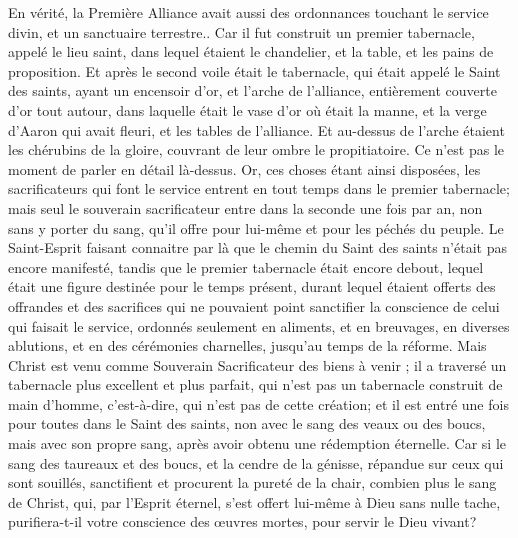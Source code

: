 \begin{multicols}{2}
\VerseOne{}En vérité, la Première Alliance avait aussi des ordonnances touchant le service divin, et un sanctuaire terrestre..
Car il fut construit un premier tabernacle, appelé le lieu saint, dans lequel étaient le chandelier, et la table, et les pains de proposition.
Et après le second voile était le tabernacle, qui était appelé le Saint des saints,
ayant un encensoir d'or, et l'arche de l'alliance, entièrement couverte d'or tout autour, dans laquelle était le vase d'or où était la manne, et la verge d'Aaron qui avait fleuri, et les tables de l'alliance.
Et au-dessus de l'arche étaient les chérubins de la gloire, couvrant de leur ombre le propitiatoire. Ce n'est pas le moment de parler en détail là-dessus.
Or, ces choses étant ainsi disposées, les sacrificateurs qui font le service entrent en tout temps dans le premier tabernacle;
mais seul le souverain sacrificateur entre dans la seconde une fois par an, non sans y porter du sang, qu'il offre pour lui-même et pour les péchés du peuple.
Le Saint-Esprit faisant connaitre par là que le chemin du Saint des saints n'était pas encore manifesté, tandis que le premier tabernacle était encore debout,
lequel était une figure destinée pour le temps présent, durant lequel étaient offerts des offrandes et des sacrifices qui ne pouvaient point sanctifier la conscience de celui qui faisait le service,
ordonnés seulement en aliments, et en breuvages, en diverses ablutions, et en des cérémonies charnelles, jusqu'au temps de la réforme.
Mais Christ est venu comme Souverain Sacrificateur des biens à venir ; il a traversé un tabernacle plus excellent et plus parfait, qui n'est pas un tabernacle construit de main d'homme, c'est-à-dire, qui n'est pas de cette création;
et il est entré une fois pour toutes dans le Saint des saints, non avec le sang des veaux ou des boucs, mais avec son propre sang, après avoir obtenu une rédemption éternelle.
Car si le sang des taureaux et des boucs, et la cendre de la génisse, répandue sur ceux qui sont souillés, sanctifient et procurent la pureté de la chair,
combien plus le sang de Christ, qui, par l'Esprit éternel, s'est offert lui-même à Dieu sans nulle tache, purifiera-t-il votre conscience des œuvres mortes, pour servir le Dieu vivant?

\end{multicols}
